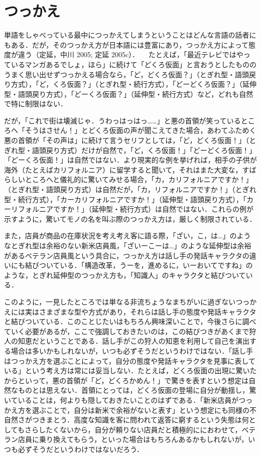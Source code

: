 \documentclass[japanese]{jnlp_1.3b}
\begin{document}
\section{つっかえ}

単語をしゃべっている最中につっかえてしまうということはどんな言語の話者にもある．だが，そのつっかえ方が日本語には豊富にあり，つっかえ方によって態度が違う（定延，中川 2005; 定延 2005c）．
　たとえば，「最近テレビではやっているマンガあるでしょ，ほら」に続けて「どくろ仮面」と言おうとしたもののうまく思い出せずつっかえる場合なら，「ど，どくろ仮面？」（とぎれ型・語頭戻り方式），「ど，くろ仮面？」（とぎれ型・続行方式），「どーどくろ仮面？」（延伸型・語頭戻り方式），「どーくろ仮面？」（延伸型・続行方式）など，どれも自然で特に制限はない．

だが，「これで街は壊滅じゃ．うわっはっはっ……」と悪の首領が笑っているところへ「そうはさせん！」とどくろ仮面の声が聞こえてきた場合，あわてふためく悪の首領が「その声は」に続けて言うセリフとしては，「ど，どくろ仮面！」（とぎれ型・語頭戻り方式）だけが自然で，「ど，くろ仮面！」「どーどくろ仮面！」「どーくろ仮面！」は自然ではない．より現実的な例を挙げれば，相手の子供が海外（たとえばカリフォルニア）に留学すると聞いて，それはまた大変な，すばらしいところへと儀礼的に驚いてみせる場合，「カ，カリフォルニアですか！」（とぎれ型・語頭戻り方式）は自然だが，「カ，リフォルニアですか！」（とぎれ型・続行方式），「カーカリフォルニアですか！」（延伸型・語頭戻り方式），「カーリフォルニアですか！」（延伸型・続行方式）は自然ではない．これらの例が示すように，驚いてモノの名を叫ぶ際のつっかえ方は，厳しく制限されている．

また，店員が商品の在庫状況を考え考え客に語る際，「ざい，こ，は…」のようなとぎれ型は余裕のない新米店員風，「ざいーこーは…」のような延伸型は余裕があるベテラン店員風という具合に，つっかえ方は話し手の発話キャラクタの違いにも結びついている．「構造改革，うーを，進めるに，いーおいてですね」のような，とぎれ延伸型のつっかえ方も，「知識人」のキャラクタと結びついている．

このように，一見したところでは単なる非流ちょうなまちがいに過ぎないつっかえには実はさまざまな型や方式があり，それらは話し手の態度や発話キャラクタと結びついている．このことじたいはもちろん興味深いことで，今後さらに調べていく必要があるが，ここで強調しておきたいのは，この結びつきがあくまで狩人の知恵だということである．話し手がこの狩人の知恵を利用して自己を演出する場合は多いかもしれないが，いつも必ずそうだというわけではない．「話し手はつっかえ方を選ぶことによって，自分の態度や発話キャラクタを見事に表している」という考え方は常には妥当しない．たとえば，どくろ仮面の出現に驚いたからといって，悪の首領が「ど，どくろかめん！」で驚きを表すという想定は自然なものとは思えない．首領にとっては，どくろ仮面の登場に自分が動揺し，驚いていることは，何よりも隠しておきたいことのはずである．「新米店員がつっかえ方を選ぶことで，自分は新米で余裕がないと表す」という想定にも同様の不自然さがつきまとう．高度な知識を客に問われて返答に窮するという失態は何としてもさらしたくないから，自分が頼りない店員だと積極的ににおわせて，ベテラン店員に乗り換えてもらう，といった場合はもちろんあるかもしれないが，いつも必ずそうだというわけではないだろう．
\end{document}
